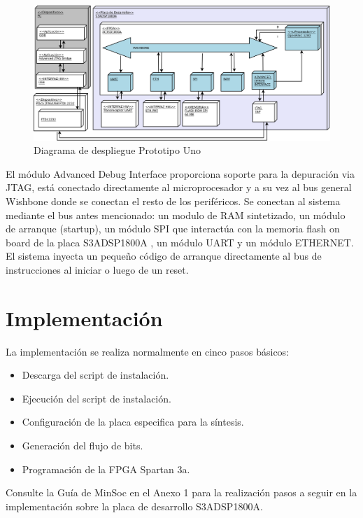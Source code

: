 		\begin{figure}[!h]
 		\begin{center}
  		\includegraphics[width=1\textwidth,keepaspectratio=true]{./images/proto1}
  		\caption{Diagrama de despliegue Prototipo Uno}
  		\label{fig:minsoc}
 		\end{center}
		\end{figure}
		
		El módulo Advanced Debug Interface proporciona soporte para la depuración via JTAG, está conectado directamente al microprocesador y a su vez al bus
		general Wishbone donde se conectan el resto de los periféricos. Se conectan al sistema mediante el bus antes mencionado: un modulo	de RAM
		sintetizado, un módulo de arranque (startup), un módulo SPI que interactúa con la memoria flash on board de la placa S3ADSP1800A , un módulo UART y
		un módulo ETHERNET. El sistema inyecta un pequeño código de arranque directamente al bus de instrucciones al iniciar o luego de un reset. 

\newpage
			
		\section{Implementación}

La implementación se realiza normalmente en cinco pasos básicos: 
\begin {itemize}
\item Descarga del script de instalación.
\item Ejecución del script de instalación.
\item Configuración de la placa especifica para la síntesis.
\item Generación del flujo de bits.
\item Programación de la FPGA Spartan 3a.
 \end {itemize}
 Consulte la Guía de MinSoc en el Anexo 1 para la realización pasos a seguir en la implementación sobre la placa de desarrollo  S3ADSP1800A.
		
